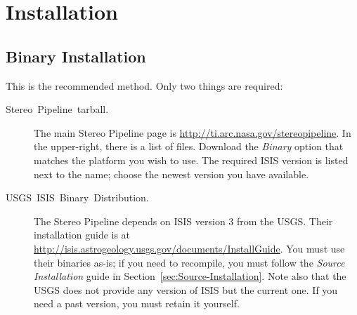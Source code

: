 \chapter{Installation}

\section{Binary Installation}

This is the recommended method. Only two things are required:

\begin{description}
\item [{Stereo~Pipeline~tarball.}] The main Stereo Pipeline page is \url{http://ti.arc.nasa.gov/stereopipeline}.
In the upper-right, there is a list of files. Download the \emph{Binary}
option that matches the platform you wish to use. The required \ac{ISIS}
version is listed next to the name; choose the newest version you
have available.

\item [{\ac{USGS}~\ac{ISIS}~Binary~Distribution.}] The Stereo Pipeline depends
on \ac{ISIS} version 3 from the USGS\@. Their installation guide is at \url{http://isis.astrogeology.usgs.gov/documents/InstallGuide}.
You must use their binaries as-is; if you need to recompile, you must
follow the \emph{Source Installation} guide in Section~\ref{sec:Source-Installation}.
Note also that the \ac{USGS} does not provide any version of \ac{ISIS} but the
current one. If you need a past version, you must retain it yourself.
\end{description}

